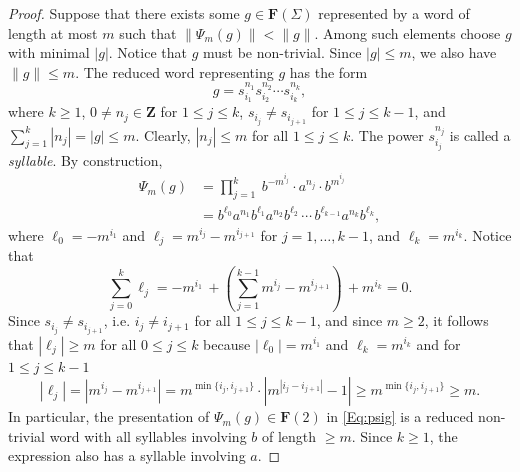 \documentclass[12pt,reqno,a4paper]{article}
\theoremstyle{definition}
\theoremstyle{remark}
\numberwithin{equation}{section}
\numberwithin{figure}{section}
\newcommand{\B}[1]{{\mathbf #1}}
\begin{document}
\begin{proof}
Suppose that there exists some $g \in \B F(\Sigma)$ represented by a word of length at most $m$ such that $\|\Psi_m(g)\|<\|g\|$.
Among such elements choose $g$ with minimal $|g|$.
Notice that $g$ must be non-trivial. 
Since $|g|\leq m$, we also have $\|g\|\leq m$. 
The reduced word representing $g$ has the form
\begin{equation}\label{Eq:g syllables}
g=s_{i_1}^{n_1}s_{i_2}^{n_2}\cdots s_{i_k}^{n_k},
\end{equation}
where $k \geq 1$, $0\neq n_j\in \B Z$ for $1\leq j\leq k$, $s_{i_j}\neq s_{i_{j+1}}$ for $1\leq j\leq k-1$, and $\sum_{j=1}^k |n_j|=|g| \leq m$.
Clearly,  $|n_j|\leq m$ for all $1 \leq j \leq k$.
The power $s_{i_j}^{n_j}$ is called a {\em syllable}. 
By construction,
\begin{align}
\Psi_m(g) 
&= \prod_{j=1}^k\ b^{-m^{i_j}}\cdot a^{n_j}\cdot b^{m^{i_j}}\nonumber\\
&=b^{\ell_0} a^{n_1} b^{\ell_1} a^{n_2} b^{\ell_2} \, \cdots \, b^{\ell_{k-1}}a^{n_k}b^{\ell_k}\label{Eq:psig},
\end{align}
where $\ell_0=-m^{i_1}$ and $\ell_j=m^{i_{j}}-m^{i_{j+1}}$ for $j=1,\ldots,k-1$, and $\ell_k=m^{i_k}$.
Notice that 
\[
\sum_{j=0}^k {\ell_j} = -m^{i_1} \, + \left(\sum_{j=1}^{k-1} m^{i_{j}}-m^{i_{j+1}}\right) \, + m^{i_k} =0.
\]
Since $s_{i_j} \neq s_{i_{j+1}}$, i.e. $i_j \neq i_{j+1}$ for all $1 \leq j \leq k-1$, and since $m \geq 2$, it follows that $|\ell_j| \geq m$ for all $0 \leq j \leq k$ because $|\ell_0| = m^{i_1}$ and $\ell_k = m^{i_k}$ and for $1 \leq j \leq k-1$
\[
| \ell_j| = |m^{i_j}-m^{i_{j+1}}| = m^{\min\{ i_j,i_{j+1}\}} \cdot  | m^{|i_j-i_{j+1}|}-1| \geq m^{\min\{ i_j,i_{j+1}\}} \geq m.
\]
In particular, the presentation of $\Psi_m(g)\in \B F(2)$ in \eqref{Eq:psig} is a reduced non-trivial word with all syllables
involving $b$ of length $ \geq m$. Since $k\geq 1$, the  expression
also has a syllable involving $a$.


\end{proof}
\end{document}
